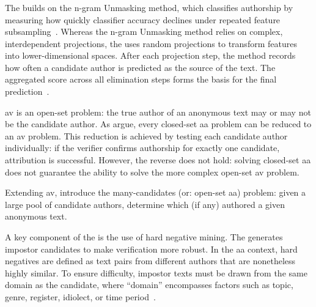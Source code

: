 
%     


\subsubsection{\impAppr{}}
\label{sec:impostor_method_theory}

The \impAppr{} builds on the n-gram Unmasking method, which classifies authorship by measuring how quickly classifier accuracy declines under repeated feature subsampling~\citep{koppel_authorship_2004}. 
Whereas the n-gram Unmasking method relies on complex, interdependent projections, the \impAppr{} uses random projections to transform features into lower-dimensional spaces.
After each projection step, the method records how often a candidate author is predicted as the source of the text. 
The aggregated score across all elimination steps forms the basis for the final prediction~\citep{tyo_state_2022}.

\ac{av} is an open-set problem: the true author of an anonymous text may or may not be the candidate author. 
As \citet{koppel_determining_2014} argue, every closed-set \ac{aa} problem can be reduced to an \ac{av} problem. 
This reduction is achieved by testing each candidate author individually: if the verifier confirms authorship for exactly one candidate, attribution is successful. 
However, the reverse does not hold: solving closed-set \ac{aa} does not guarantee the ability to solve the more complex open-set \ac{av} problem.

Extending \ac{av}, \citet{koppel_determining_2014} introduce the many-candidates (or: open-set \ac{aa}) problem: given a large pool of candidate authors, determine which (if any) authored a given anonymous text. 

A key component of the \impAppr{} is the use of hard negative mining. 
The \impAppr{} generates impostor candidates to make verification more robust. 
In the \ac{aa} context, hard negatives are defined as text pairs from different authors that are nonetheless highly similar. 
To ensure difficulty, impostor texts must be drawn from the same domain as the candidate, where “domain” encompasses factors such as topic, genre, register, idiolect, or time period~\citep{bischoff_importance_2020}. 

